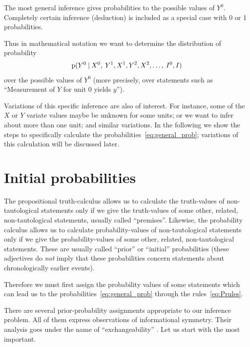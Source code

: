 \documentclass[\ifafour a4paper,12pt,\else a5paper,10pt,\fi%
onecolumn,oneside,article,%
british%
]{memoir}
\theoremstyle{remark}
\theoremstyle{innote}
\newcommand*{\p}{\mathrm{p}}%
\renewcommand*{\|}[1][]{\nonscript\:#1\vert\nonscript\:\mathopen{}}
\newcommand*{\sects}{\S\S}%
\newcommand*{\prop}[1]{\enquote{\textsf{#1}}}%
\begin{document}
The most general inference gives probabilities to the possible values of $Y^{0}$. Completely certain inference (deduction) is included as a special case with 0 or 1 probabilities.

Thus in mathematical notation we want to determine the distribution of probability
\begin{equation}
  \label{eq:general_prob}
  \p(Y^{0} \| X^{0},\: Y^{1},X^{1},Y^{2},X^{2},\dotsc,\: I^{0},I)
\end{equation}
over the possible values of $Y^{0}$ (more precisely, over statements such as \prop{Measurement of $Y$ for unit $0$ yields $y$}).

Variations of this specific inference are also of interest. For instance, some of the $X$ or $Y$ variate values maybe be unknown for some units; or we want to infer about more than one unit; and similar variations. In the following we show the steps to specifically calculate the probabilities~\eqref{eq:general_prob}; variations of this calculation will be discussed later.

\section{Initial probabilities}
\label{sec:initial_probs}

The propositional truth-calculus allows us to calculate the truth-values of non-tautological statements only if we give the truth-values of some other, related, non-tautological statements, usually called \enquote{premises}. Likewise, the probability calculus allows us to calculate probability-values of non-tautological statements only if we give the probability-values of some other, related, non-tautological statements. These are usually called \enquote{prior} or \enquote{initial} probabilities (these adjectives do \emph{not} imply that these probabilities concern statements about chronologically earlier events).

Therefore we must first assign the probability values of some statements which can lead us to the probabilities~\eqref{eq:general_prob} through the rules~\eqref{eq:Prules}.

There are several prior-probability assignments appropriate to our inference problem. All of them express observations of informational symmetry. Their analysis goes under the name of \enquote{exchangeability} \autocites[For a detailed account with references see][]{bernardoetal1994_r2000}[for a shorter summary,][]{dawid2013}[important references and variations are in][(Appendix on eduction)]{johnson1924}[\sects~4.2--4.3]{johnson1932c}{definetti1930,definetti1937,hewittetal1955,ericson1969,heathetal1976,diaconis1977,diaconisetal1980,diaconisetal1980b,lindleyetal1981}[especially around \sects~7.3, 8.6]{lindley2006_r2014}. Let us start with the most important.
\end{document}
